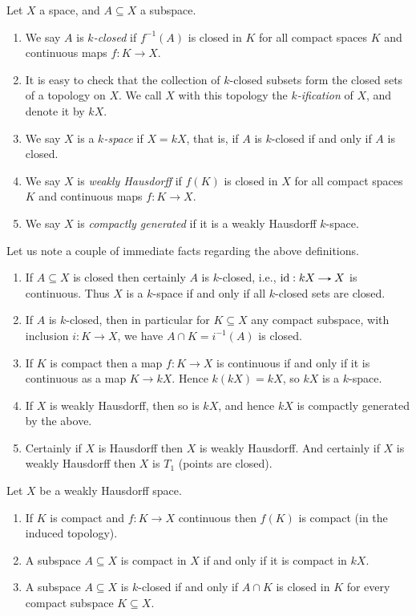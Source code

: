 \begin{definitions}
  Let $X$ a space, and $A \subseteq X$ a subspace.
  \begin{enumerate}
  \item We say $A$ is \textit{$k$-closed} if $f^{-1}(A)$ is closed in
    $K$ for all compact spaces $K$ and continuous maps $f : K \to X$.
  \item It is easy to check that the collection of $k$-closed subsets
    form the closed sets of a topology on $X$. We call $X$ with this
    topology the \textit{$k$-ification} of $X$, and denote it by $kX$.
  \item We say $X$ is a \textit{$k$-space} if $X = kX$, that is, if
    $A$ is $k$-closed if and only if $A$ is closed.
  \item We say $X$ is \textit{weakly Hausdorff} if $f(K)$ is closed in
    $X$ for all compact spaces $K$ and continuous maps $f : K \to X$.
  \item We say $X$ is \textit{compactly generated} if it is a weakly
    Hausdorff $k$-space.
  \end{enumerate}
\end{definitions}

\begin{remarks}
  \label{CGWH-rems}
  Let us note a couple of immediate facts regarding the above
  definitions.
  \begin{enumerate}
  \item If $A \subseteq X$ is closed then certainly $A$ is $k$-closed,
    i.e., $\id : kX \to X$ is continuous. Thus $X$ is a $k$-space if
    and only if all $k$-closed sets are closed.
  \item If $A$ is $k$-closed, then in particular for $K \subseteq X$
    any compact subspace, with inclusion $i : K \to X$, we have $A
    \cap K = i^{-1}(A)$ is closed.
  \item If $K$ is compact then a map $f : K \to X$ is continuous if
    and only if it is continuous as a map $K \to kX$. Hence $k(kX) =
    kX$, so $kX$ is a $k$-space.
  \item If $X$ is weakly Hausdorff, then so is $kX$, and hence $kX$ is
    compactly generated by the above.
  \item Certainly if $X$ is Hausdorff then $X$ is weakly
    Hausdorff. And certainly if $X$ is weakly Hausdorff then $X$ is
    $T_1$ (points are closed).
  \end{enumerate}
\end{remarks}

\begin{lemma}
  \label{WH-props}
  Let $X$ be a weakly Hausdorff space.
  \begin{enumerate}
  \item If $K$ is compact and $f : K \to X$ continuous then $f(K)$ is
    compact (in the induced topology).
  \item A subspace $A \subseteq X$ is compact in $X$ if and only if it
    is compact in $kX$.
  \item A subspace $A \subseteq X$ is $k$-closed if and only if $A
    \cap K$ is closed in $K$ for every compact subspace $K \subseteq
    X$.
  \end{enumerate}
\end{lemma}

